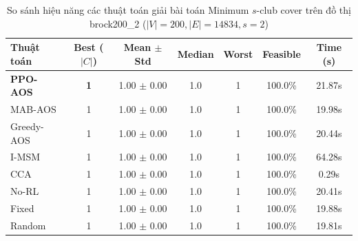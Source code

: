 \begin{table}[htbp]
\centering
\caption{So sánh hiệu năng các thuật toán giải bài toán Minimum $s$-club cover trên đồ thị brock200_2 ($|V|=200, |E|=14834, s=2$)}
\label{tab:results_brock200_2}
\begin{tabular}{lcccccc}
\hline
\textbf{Thuật toán} & \textbf{Best ($|C|$)} & \textbf{Mean $\pm$ Std} & \textbf{Median} & \textbf{Worst} & \textbf{Feasible} & \textbf{Time (s)} \\
\hline
\textbf{PPO-AOS} & \textbf{1} & 1.00 $\pm$ 0.00 & 1.0 & 1 & 100.0\% & 21.87s \\
MAB-AOS & 1 & 1.00 $\pm$ 0.00 & 1.0 & 1 & 100.0\% & 19.98s \\
Greedy-AOS & 1 & 1.00 $\pm$ 0.00 & 1.0 & 1 & 100.0\% & 20.44s \\
I-MSM & 1 & 1.00 $\pm$ 0.00 & 1.0 & 1 & 100.0\% & 64.28s \\
CCA & 1 & 1.00 $\pm$ 0.00 & 1.0 & 1 & 100.0\% & 0.29s \\
No-RL & 1 & 1.00 $\pm$ 0.00 & 1.0 & 1 & 100.0\% & 20.41s \\
Fixed & 1 & 1.00 $\pm$ 0.00 & 1.0 & 1 & 100.0\% & 19.88s \\
Random & 1 & 1.00 $\pm$ 0.00 & 1.0 & 1 & 100.0\% & 19.81s \\
\hline
\end{tabular}
\end{table}
